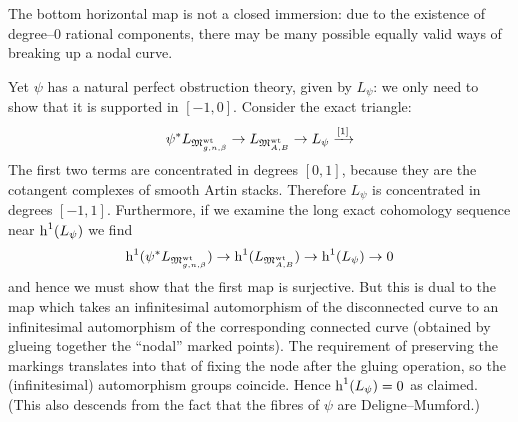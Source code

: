 \begin{remark}
The bottom horizontal map is not a closed immersion: due to the existence of degree--$0$ rational components, there may be many possible equally valid ways of breaking up a nodal curve.

Yet $\psi$ has a natural perfect obstruction theory, given by $L_{\psi}$: we only need to show that it is supported in $[-1,0]$. Consider the exact triangle:
\begin{equation*} \psi^* L_{\mathfrak M_{g,n,\beta}^{\operatorname{wt}}} \rightarrow L_{\mathfrak M_{A,B}^{\operatorname{wt}}} \rightarrow L_\psi \xrightarrow{[1]} \end{equation*}
The first two terms are concentrated in degrees $[0,1]$, because they are the cotangent complexes of smooth Artin stacks. Therefore $L_\psi$ is concentrated in degrees $[-1,1]$. Furthermore, if we examine the long exact cohomology sequence near $\operatorname{h}^1(L_\psi)$ we find
\begin{equation*} \operatorname{h}^1(\psi^* L_{\mathfrak M_{g,n,\beta}^{\operatorname{wt}}}) \rightarrow \operatorname{h}^1(L_{\mathfrak M_{A,B}^{\operatorname{wt}}}) \rightarrow \operatorname{h}^1(L_\psi) \rightarrow 0 \end{equation*}
and hence we must show that the first map is surjective. But this is dual to the map which takes an infinitesimal automorphism of the disconnected curve to an infinitesimal automorphism of the corresponding connected curve (obtained by glueing together the ``nodal'' marked points). The requirement of preserving the markings translates into that of fixing the node after the gluing operation, so the (infinitesimal) automorphism groups coincide. Hence $\operatorname{h}^1(L_\psi) = 0$ as claimed. (This also descends from the fact that the fibres of $\psi$ are Deligne--Mumford.)
\end{remark}

